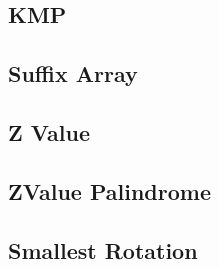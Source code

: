 \documentclass[a4paper,10pt,twocolumn,oneside]{article}
\begin{document}
%

\subsection{KMP}


\subsection{Suffix Array}


%

%

\subsection{Z Value}


%

\subsection{ZValue Palindrome}


\subsection{Smallest Rotation}


%
\end{document}

